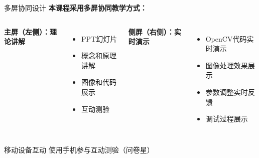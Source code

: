 \documentclass[aspectratio=169, 10pt]{beamer}
\begin{document}
\begin{frame}{多屏协同设计}
    \textbf{本课程采用多屏协同教学方式：}

    \vspace{0.3cm}

    \begin{columns}
        \textbf{主屏（左侧）：理论讲解}
        \begin{itemize}
            \item PPT幻灯片
            \item 概念和原理讲解
            \item 图像和代码展示
            \item 互动测验
        \end{itemize}

        \textbf{侧屏（右侧）：实时演示}
        \begin{itemize}
            \item OpenCV代码实时演示
            \item 图像处理效果展示
            \item 参数调整实时反馈
            \item 调试过程展示
        \end{itemize}
    \end{columns}

    \vspace{0.5cm}

    \begin{block}{移动设备互动}
        使用手机参与互动测验（问卷星）
    \end{block}
\end{frame}
\end{document}
